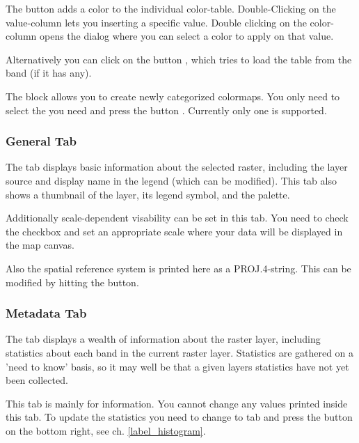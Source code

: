 The button  adds a color to the individual color-table.
Double-Clicking on the value-column lets you inserting a specific value.
Double clicking on the color-column opens the dialog  where you can select a color to apply on that value.

Alternatively you can click on the button
, which tries to
load the table from the band (if it has any).

The block  allows you to create newly
categorized colormaps. You only need to select the  you need and press the button . Currently
only one  is
supported.

\subsubsection{General Tab}\label{label_generaltab}

The  tab displays basic information about the selected raster,
including the layer source and  display name in the legend (which can be
modified). This tab also shows a thumbnail of the layer, its legend symbol,
and the palette.

Additionally scale-dependent visability can be set in this tab. You need to
check the checkbox and set an appropriate scale where your data will be
displayed in the map canvas.

Also the spatial reference system is printed here as a PROJ.4-string. 
This can be modified by hitting the  button.

\subsubsection{Metadata Tab}\label{label_metatab}

The  tab displays a wealth of information about the raster layer,
including statistics about each band in the current raster layer. Statistics
are gathered on a 'need to know' basis, so it may well be that a given layers
statistics have not yet been collected.

This tab is mainly for information. You cannot change any values printed
inside this tab. To update the statistics you need to change to tab
 and press the button  on the bottom right,
see ch. \ref{label_histogram}.

